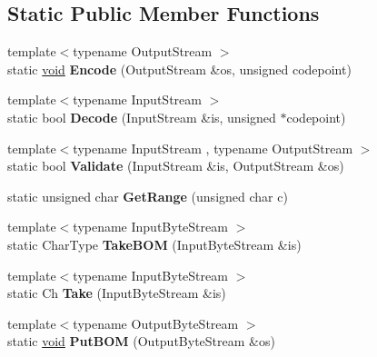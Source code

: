 \subsection*{Static Public Member Functions}
\begin{DoxyCompactItemize}
\item 
\hypertarget{struct_u_t_f8_af286ed19ca60d261a9b11b65bee1298b}{}{\footnotesize template$<$typename Output\+Stream $>$ }\\static \hyperlink{_s_d_l__audio_8h_a52835ae37c4bb905b903cbaf5d04b05f}{void} {\bfseries Encode} (Output\+Stream \&os, unsigned codepoint)\label{struct_u_t_f8_af286ed19ca60d261a9b11b65bee1298b}

\item 
\hypertarget{struct_u_t_f8_a17c6badb31acf4f784111c886737fb17}{}{\footnotesize template$<$typename Input\+Stream $>$ }\\static bool {\bfseries Decode} (Input\+Stream \&is, unsigned $\ast$codepoint)\label{struct_u_t_f8_a17c6badb31acf4f784111c886737fb17}

\item 
\hypertarget{struct_u_t_f8_a9e2e7e37d819baeb5e643654c6e61e33}{}{\footnotesize template$<$typename Input\+Stream , typename Output\+Stream $>$ }\\static bool {\bfseries Validate} (Input\+Stream \&is, Output\+Stream \&os)\label{struct_u_t_f8_a9e2e7e37d819baeb5e643654c6e61e33}

\item 
\hypertarget{struct_u_t_f8_ac06bbf38df41adb0c7b9eaa93f85cc38}{}static unsigned char {\bfseries Get\+Range} (unsigned char c)\label{struct_u_t_f8_ac06bbf38df41adb0c7b9eaa93f85cc38}

\item 
\hypertarget{struct_u_t_f8_a1b2359d6ea50ae32fefc9b28e9878a31}{}{\footnotesize template$<$typename Input\+Byte\+Stream $>$ }\\static Char\+Type {\bfseries Take\+B\+O\+M} (Input\+Byte\+Stream \&is)\label{struct_u_t_f8_a1b2359d6ea50ae32fefc9b28e9878a31}

\item 
\hypertarget{struct_u_t_f8_a5b2561a5031c8a699e593cd51b2c6864}{}{\footnotesize template$<$typename Input\+Byte\+Stream $>$ }\\static Ch {\bfseries Take} (Input\+Byte\+Stream \&is)\label{struct_u_t_f8_a5b2561a5031c8a699e593cd51b2c6864}

\item 
\hypertarget{struct_u_t_f8_a6b171e5f0662ad81d498875bbdbc536a}{}{\footnotesize template$<$typename Output\+Byte\+Stream $>$ }\\static \hyperlink{_s_d_l__audio_8h_a52835ae37c4bb905b903cbaf5d04b05f}{void} {\bfseries Put\+B\+O\+M} (Output\+Byte\+Stream \&os)\label{struct_u_t_f8_a6b171e5f0662ad81d498875bbdbc536a}


\end{DoxyCompactItemize}
